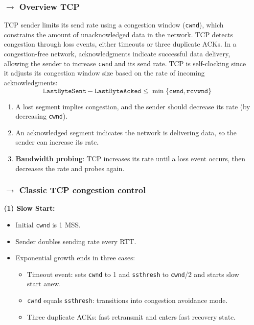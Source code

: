 \subsubsection[3.6.2 Overview TCP]{$\pmb{\rightarrow}$ Overview TCP}

\noindent TCP sender limits its send rate using a congestion window (\texttt{cwnd}), which constrains the amount of unacknowledged data in the network. TCP detects congestion through loss events, either timeouts or three duplicate ACKs. In a congestion-free network, acknowledgments indicate successful data delivery, allowing the sender to increase \texttt{cwnd} and its send rate. TCP is self-clocking since it adjusts its congestion window size based on the rate of incoming acknowledgments:
$$
    \boxed{\texttt{LastByteSent} - \texttt{LastByteAcked} \leq \min\{\texttt{cwnd}, \texttt{rcvwnd}\}}
$$

\begin{enumerate}
    \item A lost segment implies congestion, and the sender should decrease its rate (by decreasing \texttt{cwnd}).
    \item An acknowledged segment indicates the network is delivering data, so the sender can increase its rate.
    \item \textbf{Bandwidth probing}: TCP increases its rate until a loss event occurs, then decreases the rate and probes again.
\end{enumerate}


\subsubsection[3.6.3 Classic TCP congestion control]{$\pmb{\rightarrow}$ Classic TCP congestion control}

\noindent \textbf{(1) Slow Start:}
\begin{itemize}[noitemsep, nolistsep]
    \item Initial \texttt{cwnd} is 1 MSS.
    \item Sender doubles sending rate every RTT.
    \item Exponential growth ends in three cases:
    \begin{itemize}[noitemsep, nolistsep]
        \item Timeout event: sets \texttt{cwnd} to 1 and \texttt{ssthresh} to \texttt{cwnd}/2 and starts slow start anew.
        \item \texttt{cwnd} equals \texttt{ssthresh}: transitions into congestion avoidance mode.
        \item Three duplicate ACKs: fast retransmit and enters fast recovery state.
    \end{itemize}
\end{itemize}

